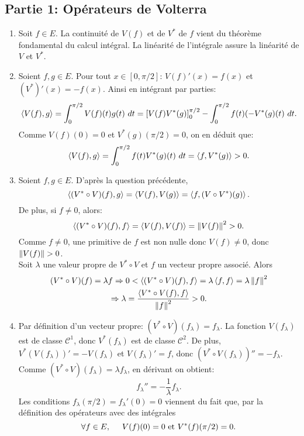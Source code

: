 \subsection*{Partie 1: Opérateurs de Volterra}

\begin{enumerate}
\item Soit $f\in E$. La continuité de $V(f)$ et de $V^{*}$ de $f$ vient du théorème fondamental du calcul intégral. La linéarité de l'intégrale assure la linéarité de $V$ et $V^{*}$.

\item Soient $f,g\in E$. Pour tout $x\in [0,\pi /2]$: $V(f)'(x) = f(x)$ et $(V^{*})'(x) = -f(x)$. Ainsi en intégrant par parties:
\begin{displaymath}
\scal{V(f)}{g} = \int_{0}^{\pi /2}V(f)(t) g(t)\ dt 
= \left [ V(f)V^{*}(g)\right ]_{0}^{\pi/2} -\int_{0}^{\pi /2}f(t)(-V^{*}(g)(t)\ dt .
\end{displaymath}
Comme $V(f)(0) = 0$ et $V^{*}(g)(\pi /2) = 0$, on en déduit que:
$$\left\langle {V(f)} , {g} \right\rangle = \int_{0}^{\pi /2}f(t)V^{*}(g)(t)\ dt = \left\langle {f} , {V^{*}(g)} \right\rangle>0.$$

\item Soient $f,g\in E$. D'après la question précédente,
$$\left\langle {(V^{*}\circ V)(f)} , {g} \right\rangle = \left\langle {V(f)} , {V(g)} \right\rangle = \left\langle {f} , {(V\circ V^{*})(g)} \right\rangle.$$
De plus, si $f\neq 0$, alors:
$$\left\langle {(V^{*}\circ V)(f)} , {f} \right\rangle = \left\langle {V(f)} , {V(f)} \right\rangle = \left\Vert V(f)\right\Vert^{2}>0.$$
Comme $f\neq 0$, une primitive de $f$ est non nulle donc $V(f)\neq 0$, donc $\left\Vert V(f)\right\Vert>0$.\\
Soit $\lambda$ une valeur propre de $V^{*}\circ V$ et $f$ un vecteur propre associé. Alors 
\begin{multline*}
(V^{*}\circ V)(f) = \lambda f 
\Rightarrow 0< \left\langle {(V^{*}\circ V)(f)} , {f} \right\rangle = \lambda \left\langle {f} , {f} \right\rangle = \lambda \left\Vert f\right\Vert^{2}\\
\Rightarrow \lambda  = \frac{\left\langle {V^{*}\circ V(f)} , {f} \right\rangle}{\left\Vert f\right\Vert^{2}}>0.
\end{multline*}

\item Par définition d'un vecteur propre: $(V^{*}\circ V)(f_{\lambda}) = f_{\lambda}$. La fonction $V(f_{\lambda})$ est de classe $\mathcal{C}^{1}$, donc $V^{*}(f_{\lambda})$ est de classe $\mathcal{C}^{2}$. De plus, $V^{*}(V(f_{\lambda}))' = -V(f_{\lambda})$ et $V(f_{\lambda})' = f$, donc $(V^{*}\circ V(f_{\lambda}))'' = -f_{\lambda}$. Comme $(V^{*}\circ V)(f_{\lambda}) = \lambda f_{\lambda}$,  en dérivant on obtient:
$$f_{\lambda}'' = -\frac{1}{\lambda}f_{\lambda}.$$
Les conditions $f_{\lambda}(\pi /2) = f_{\lambda}'(0) = 0$ viennent du fait que, par la définition des opérateurs avec des intégrales
\begin{displaymath}
\forall f \in E, \hspace{0.5cm} V(f)(0) = 0 \text{ et } V^{*}(f)(\pi /2) = 0 .
\end{displaymath} 


\end{enumerate}

